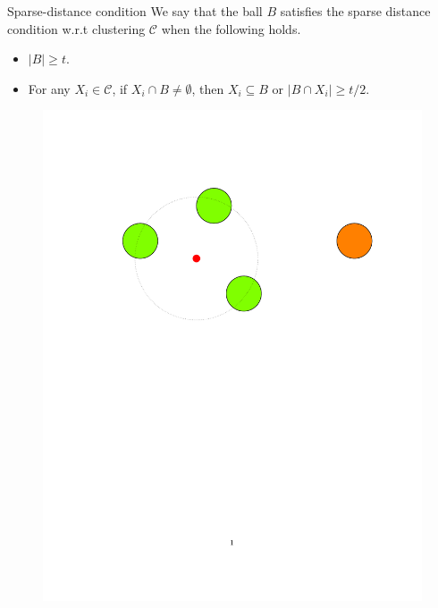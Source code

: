 \documentclass{beamer}
\newcommand{\mc}{\mathcal}
\begin{document}
\begin{frame}{Sparse-distance condition}
    We say that the ball $B$ satisfies the sparse distance condition w.r.t clustering $\mc C$ when the following holds.
	\begin{itemize}
	  \item $|B| \ge t$.
	  \item For any $X_i \in \mc C$, if $X_i \cap B \neq \emptyset$, then $X_i \subseteq B$ or $|B \cap X_i| \ge t/2$.
	\end{itemize}

   \begin{figure}
	  \includegraphics[trim = 100 0 0 100, clip, width=\linewidth]{figures/sparseDistanceSatisfied.pdf}
   \end{figure}
\end{frame}
\end{document}
